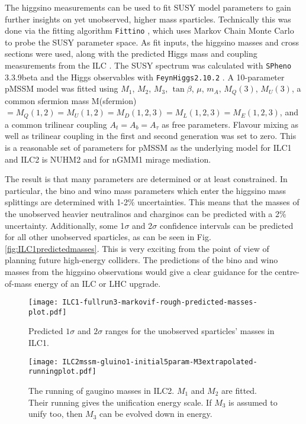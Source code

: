 \documentclass{PoS}
\begin{document}
The higgsino measurements can be used to fit SUSY model parameters to gain further insights 
on yet unobserved, higher mass sparticles. 
Technically this was done via the fitting algorithm \texttt{Fittino} \cite{Bechtle:2004pc}, 
which uses Markov Chain Monte Carlo to probe the SUSY parameter space. 
As fit inputs, the higgsino masses and cross sections were used, 
along with the predicted Higgs mass and coupling measurements from the ILC \cite{Fujii:2015jha}. 
The SUSY spectrum was calculated with \texttt{SPheno} 3.3.9beta \cite{Porod:2003um} 
and the Higgs observables with \texttt{FeynHiggs2.10.2} \cite{Heinemeyer:1998yj}. 
A 10-parameter pMSSM model was fitted using $M_1$, $M_2$, $M_3$, $\tan \beta$, $\mu$, $m_A$, $M_Q(3)$, $M_U(3)$, a common sfermion mass M(sfermion) $=M_Q(1,2)=M_U(1,2)=M_D(1,2,3)=M_L(1,2,3)=M_E(1,2,3)$, and a common trilinear coupling $A_t=A_b=A_{\tau}$ as free parameters. 
Flavour mixing as well as trilinear coupling in the first and second generation was set to zero. 
This is a reasonable set of parameters for pMSSM as the underlying model for ILC1 and ILC2 is NUHM2 
and for nGMM1 mirage mediation. 

The result is that many parameters are determined or at least constrained. 
In particular, the bino and wino mass parameters which enter the higgsino mass splittings 
are determined with 1-2\% uncertainties. 
This means that the masses of the unobserved heavier neutralinos and charginos can be predicted 
with a 2\% uncertainty. 
Additionally, some 1$\sigma$ and 2$\sigma$ confidence intervals can be predicted for all other unobserved sparticles, 
as can be seen in Fig. \ref{fig:ILC1predictedmasses}. 
This is very exciting from the point of view of planning future high-energy colliders. 
The predictions of the bino and wino masses from the higgsino observations would give a clear guidance 
for the centre-of-mass energy of an ILC or LHC upgrade.



\begin{figure}[htbp]
 \begin{minipage}[t]{0.48\linewidth}
  \begin{center}
 \texttt{[image: ILC1-fullrun3-markovif-rough-predicted-masses-plot.pdf]}
  \end{center}
\caption{Predicted $1\sigma$ and $2\sigma$ ranges for the unobserved sparticles' masses in ILC1.}
\label{fig:ILC1predictedmasses}
 \end{minipage}
 \hfill
 \begin{minipage}[t]{0.48\linewidth}
  \begin{center}
    \texttt{[image: ILC2mssm-gluino1-initial5param-M3extrapolated-runningplot.pdf]}
          \end{center}
 \caption{The running of gaugino masses in ILC2. $M_1$ and $M_2$ are fitted. Their running gives the unification energy scale. If $M_3$ is assumed to unify too, then $M_3$ can be evolved down in energy.}
\label{fig:ILC2runningplot}
 \end{minipage}
\end{figure}
\end{document}
